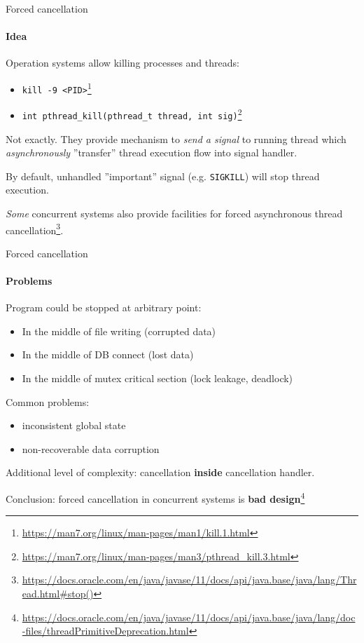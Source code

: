\begin{frame}{Forced cancellation}
\framesubtitle{Idea}

Operation systems allow killing processes and threads: 
\begin{itemize}
    \item \texttt{kill -9 <PID>}\footnote{\tiny\url{https://man7.org/linux/man-pages/man1/kill.1.html}}
    \item \texttt{int pthread\_kill(pthread\_t thread, int sig)}\footnote{\tiny\url{https://man7.org/linux/man-pages/man3/pthread_kill.3.html}}

\end{itemize}

\pause

Not exactly. They provide mechanism to \textit{send a signal} to running thread which \textit{asynchronously} ''transfer'' thread execution flow into signal handler.

\pause

By default, unhandled ''important'' signal (e.g. \texttt{SIGKILL}) will stop thread execution.

\pause

\textit{Some} concurrent systems also provide facilities for forced asynchronous thread cancellation\footnote<4->{\tiny\url{https://docs.oracle.com/en/java/javase/11/docs/api/java.base/java/lang/Thread.html#stop()}}.


\end{frame}


\begin{frame}{Forced cancellation}
\framesubtitle{Problems}

Program could be stopped at arbitrary point:
\begin{itemize}
    \item In the middle of file writing (corrupted data)
    \item In the middle of DB connect (lost data)
    \item In the middle of mutex critical section (lock leakage, deadlock)
\end{itemize}

\pause

Common problems:
\begin{itemize}
    \item inconsistent global state
    \item non-recoverable data corruption
\end{itemize}

\pause
Additional level of complexity: cancellation \textbf{inside} cancellation handler.


\pause

Conclusion: forced cancellation in concurrent systems is \textbf{bad design}\footnote<4->{\tiny\url{https://docs.oracle.com/en/java/javase/11/docs/api/java.base/java/lang/doc-files/threadPrimitiveDeprecation.html}}

\end{frame}

